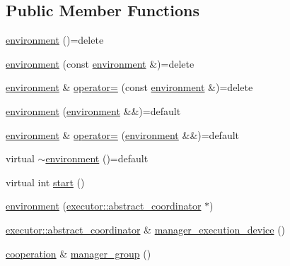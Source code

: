 \subsection*{Public Member Functions}
\begin{DoxyCompactItemize}
\item 
\hyperlink{classactor__zeta_1_1environment_1_1environment_a6e6c17cdf01539286c9613b54ac1d4c1}{environment} ()=delete
\item 
\hyperlink{classactor__zeta_1_1environment_1_1environment_a9eae9b55e2d774c0bfaeca8cd5fc77f4}{environment} (const \hyperlink{classactor__zeta_1_1environment_1_1environment}{environment} \&)=delete
\item 
\hyperlink{classactor__zeta_1_1environment_1_1environment}{environment} \& \hyperlink{classactor__zeta_1_1environment_1_1environment_a1ffbad75441e2fe5f65db35df30bb5e7}{operator=} (const \hyperlink{classactor__zeta_1_1environment_1_1environment}{environment} \&)=delete
\item 
\hyperlink{classactor__zeta_1_1environment_1_1environment_a4e2692f38884e10873192f634ba6cfae}{environment} (\hyperlink{classactor__zeta_1_1environment_1_1environment}{environment} \&\&)=default
\item 
\hyperlink{classactor__zeta_1_1environment_1_1environment}{environment} \& \hyperlink{classactor__zeta_1_1environment_1_1environment_a6507409258b8dd2e1629fa6016fc536d}{operator=} (\hyperlink{classactor__zeta_1_1environment_1_1environment}{environment} \&\&)=default
\item 
virtual \hyperlink{classactor__zeta_1_1environment_1_1environment_af8b5af67dbf7a9e05fa1603f239d7a49}{$\sim$environment} ()=default
\item 
virtual int \hyperlink{classactor__zeta_1_1environment_1_1environment_a96929615c4a4acb6ce4aabe9a7a43db9}{start} ()
\item 
\hyperlink{classactor__zeta_1_1environment_1_1environment_a2288101cbca38b4bfc49063e549753eb}{environment} (\hyperlink{classactor__zeta_1_1executor_1_1abstract__coordinator}{executor\+::abstract\+\_\+coordinator} $\ast$)
\item 
\hyperlink{classactor__zeta_1_1executor_1_1abstract__coordinator}{executor\+::abstract\+\_\+coordinator} \& \hyperlink{classactor__zeta_1_1environment_1_1environment_a794484ecbecd03c48214bae1182055f9}{manager\+\_\+execution\+\_\+device} ()
\item 
\hyperlink{classactor__zeta_1_1environment_1_1cooperation}{cooperation} \& \hyperlink{classactor__zeta_1_1environment_1_1environment_ad556eeb7ecd8fcd6337e2af39e57ce9e}{manager\+\_\+group} ()
\end{DoxyCompactItemize}
